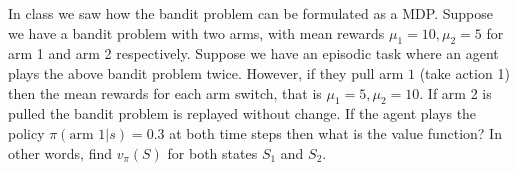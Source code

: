 In class we saw how the bandit problem can be formulated as 
a MDP. Suppose we have a bandit problem with two arms, with mean
rewards $\mu_1 = 10, \mu_2=5$ for arm 1 and arm 2 respectively.
Suppose we have an episodic task where an agent plays the above bandit problem
twice. However, if they pull arm $1$ (take action 1) then the mean rewards 
for each arm switch, that is $\mu_1=5, \mu_2=10$. If arm 2 is pulled 
the bandit problem is replayed without change.
If the agent plays the policy $\pi(\mbox{arm } 1|s) = 0.3$ at both time steps 
then what is the value function? In other words, find $v_{\pi}(S)$
for both states $S_1$ and $S_2$.
\smallspace



